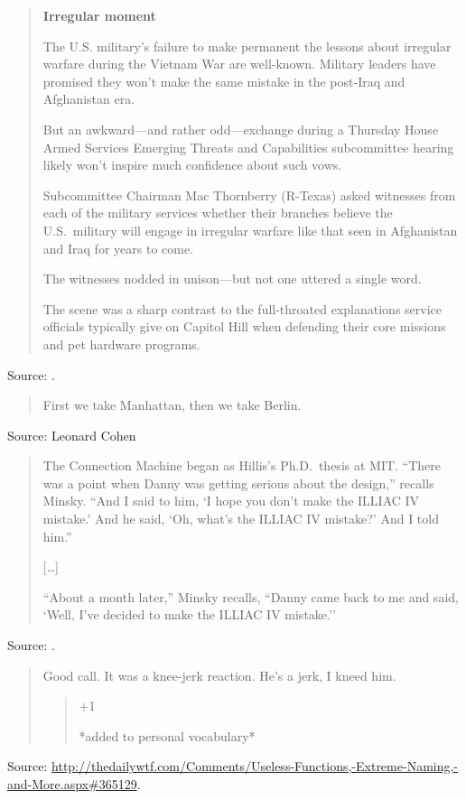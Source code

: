 \documentclass[a4paper]{article}
\begin{document}
\begin{quote}
	\textbf{Irregular moment}

	The U.S. military's failure to make permanent the lessons about irregular warfare during the
	Vietnam War are well-known.  Military leaders have promised they won't make the same mistake in
	the post-Iraq and Afghanistan era.

	But an awkward---and rather odd---exchange during a Thursday House Armed Services Emerging
	Threats and Capabilities subcommittee hearing likely won't inspire much confidence about such
	vows.

	Subcommittee Chairman Mac Thornberry (R-Texas) asked witnesses from each of the military
	services whether their branches believe the U.S.\ military will engage in irregular warfare
	like that seen in Afghanistan and Iraq for years to come.

	The witnesses nodded in unison---but not one uttered a single word.

	The scene was a sharp contrast to the full-throated explanations service officials typically
	give on Capitol Hill when defending their core missions and pet hardware programs.
\end{quote}
Source: \citet{Bennett2011}.
\medskip

\begin{quote}
	First we take Manhattan, then we take Berlin.
\end{quote}
Source: Leonard Cohen
\medskip

\begin{quote}
	The Connection Machine began as Hillis's Ph.D.\ thesis
at MIT. ``There was a point when Danny was getting
serious about the design,'' recalls Minsky.  ``And I said
to him, `I hope you don't make the ILLIAC IV mistake.'
And he said, `Oh, what's the ILLIAC IV mistake?' And
I told him.''

[\ldots]

``About a month later,'' Minsky recalls, ``Danny came
back to me and said, `Well, I've decided to make the
ILLIAC IV mistake.''
\end{quote}
Source: \citet[pp.\ 203--204]{Hoffman1988}.
\medskip

\begin{quote}
Good call. It was a knee-jerk reaction. He's a jerk, I kneed him.
	\begin{quote}
	+1

	*added to personal vocabulary*
	\end{quote}
\end{quote}
Source:
\url{http://thedailywtf.com/Comments/Useless-Functions,-Extreme-Naming,-and-More.aspx#365129}.
\medskip
\end{document}
